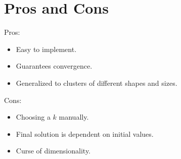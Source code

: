 \documentclass[
	number={6},
	title={Clustering}
]{cs584notes}
\begin{document}
\section{Pros and Cons}\label{sec:k-means-pros-and-cons}
Pros:
\begin{itemize}
	\item Easy to implement.
	\item Guarantees convergence.
	\item Generalized to clusters of different shapes and sizes.
\end{itemize}
Cons:
\begin{itemize}
	\item Choosing a $k$ manually.
	\item Final solution is dependent on initial values.
	\item Curse of dimensionality.
\end{itemize}
\end{document}
